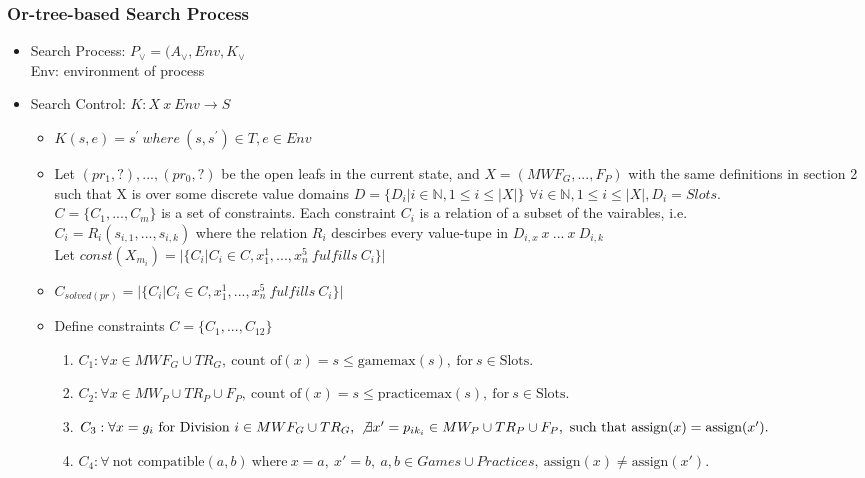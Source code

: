 \documentclass[12 pt]{article}        	%
\begin{document}
\subsubsection{Or-tree-based Search Process}
\begin{itemize}
    \item Search Process: $P_{\lor} = (A_{\lor}, Env, K_{\lor}$
    \\Env: environment of process
    \item Search Control: $K: X \: x \: Env \to S$
    \begin{itemize}
        \item $K(s,e) = s^{'} \: where \: (s, s^{'}) \in T, e \in Env$
        \item Let $(pr_1, ?), ..., (pr_0, ?)$ be the open leafs in the current state, and $X = (MWF_G, ..., F_P)$ with the same definitions in section 2 such that X is over some discrete value domains $D = \{D_i | i \in \mathbb{N}, 1 \leq i \leq |X| \}$
        $\forall i \in \mathbb{N}, 1 \leq i \leq |X|, D_i = Slots$.
        \\ $C = \{C_1, ..., C_m\} $ is a set of constraints. Each constraint $C_i$ is a relation of a subset of the vairables, i.e.
        \\ $C_i = R_i(s_{i,1}, ..., s_{i,k})$ where the relation $R_i$ descirbes every value-tupe in $D_{i, x} \: x \: ... \: x \: D_{i,k} $
        \\ Let $const(X_{m_i}) = |\{C_i|C_i \in C, x_1^1, ..., x_n^5 \: fulfills \: C_i\}|$ 
        \item $C_{solved(pr)} = |\{C_i|C_i \in C, x_1^1, ..., x_n^5 \: fulfills \: C_i \}|$
        \item Define constraints $C = \{C_1, ..., C_{12}\}$
        \begin{enumerate}
            \item $C_1: \forall x \in MWF_G \cup TR_G, \ \text{count of}(x) = s \leq \text{gamemax}(s), \ \text{for} \ s \in \text{Slots}.$
            \item $C_2: \forall x \in MW_P \cup TR_P \cup F_P, \ \text{count of}(x) = s \leq \text{practicemax}(s), \ \text{for} \ s \in \text{Slots}.$
            \item $C_3: \forall x = g_i \ \text{for Division} \ i \in MWF_G \cup TR_G, \ \not\exists x' = p_{ik_i} \in MW_P \cup TR_P \cup F_P, \ \text{such that} \ \text{assign}(x) = \text{assign}(x').$
            \item $C_4: \forall \ \text{not compatible}(a, b) \ \text{where} \ x = a, \ x' = b, \ a, b \in Games \cup Practices, \ \text{assign}(x) \neq \text{assign}(x').$

\end{enumerate}
\end{itemize}
\end{itemize}
\end{document}
